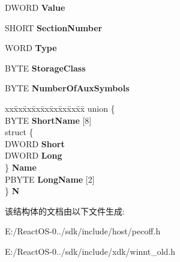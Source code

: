 \begin{DoxyCompactItemize}
\begin{tabbing}
\end{tabbing}\item 
\mbox{\label{struct___i_m_a_g_e___s_y_m_b_o_l_a5ba0694593a3d3ce91a0ada2ad4152e0}} 
D\+W\+O\+RD {\bfseries Value}
\item 
\mbox{\label{struct___i_m_a_g_e___s_y_m_b_o_l_afeafafd1534a828c98061f7d00677e1e}} 
S\+H\+O\+RT {\bfseries Section\+Number}
\item 
\mbox{\label{struct___i_m_a_g_e___s_y_m_b_o_l_a1103e00d495a47d2802aed82b16117ec}} 
W\+O\+RD {\bfseries Type}
\item 
\mbox{\label{struct___i_m_a_g_e___s_y_m_b_o_l_aa7bb5cd9c4cbf93bb3ba78d700410215}} 
B\+Y\+TE {\bfseries Storage\+Class}
\item 
\mbox{\label{struct___i_m_a_g_e___s_y_m_b_o_l_a4673210428158a0bee115ca367374051}} 
B\+Y\+TE {\bfseries Number\+Of\+Aux\+Symbols}
\item 
\mbox{\label{struct___i_m_a_g_e___s_y_m_b_o_l_a6f38a7dca2802b037af2be438e6b5705}} 
\begin{tabbing}
xx\=xx\=xx\=xx\=xx\=xx\=xx\=xx\=xx\=\kill
union \{\\
\>BYTE {\bfseries ShortName} \mbox{[}8\mbox{]}\\
\>struct \{\\
\>\>DWORD {\bfseries Short}\\
\>\>DWORD {\bfseries Long}\\
\>\} {\bfseries Name}\\
\>PBYTE {\bfseries LongName} \mbox{[}2\mbox{]}\\
\} {\bfseries N}\\

\end{tabbing}\end{DoxyCompactItemize}


该结构体的文档由以下文件生成\+:\begin{DoxyCompactItemize}
\item 
E\+:/\+React\+O\+S-\/0../sdk/include/host/pecoff.\+h\item 
E\+:/\+React\+O\+S-\/0../sdk/include/xdk/winnt\+\_\+old.\+h\end{DoxyCompactItemize}
